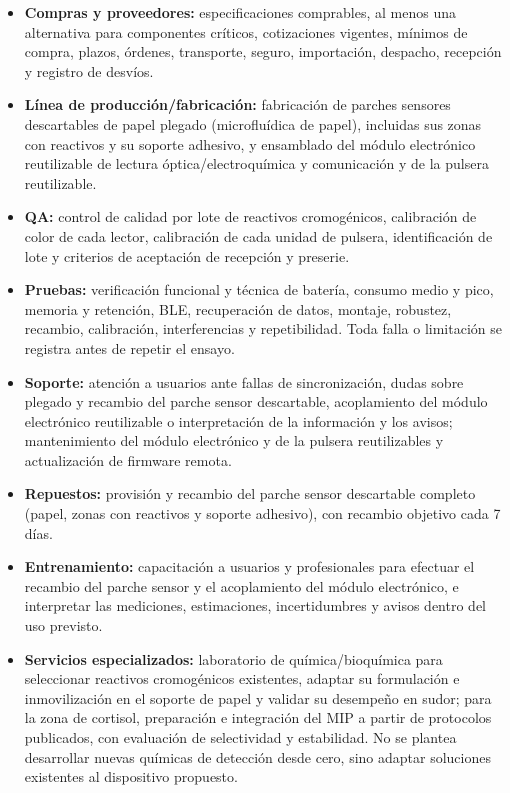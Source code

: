 \begin{itemize}
    \item \textbf{Compras y proveedores:} especificaciones comprables, al menos una alternativa para componentes críticos, cotizaciones vigentes, mínimos de compra, plazos, órdenes, transporte, seguro, importación, despacho, recepción y registro de desvíos.
    \item \textbf{Línea de producción/fabricación:} fabricación de parches sensores descartables de papel plegado (microfluídica de papel), incluidas sus zonas con reactivos y su soporte adhesivo, y ensamblado del módulo electrónico reutilizable de lectura óptica/electroquímica y comunicación y de la pulsera reutilizable.
    \item \textbf{QA:} control de calidad por lote de reactivos cromogénicos, calibración de color de cada lector, calibración de cada unidad de pulsera, identificación de lote y criterios de aceptación de recepción y preserie.
    \item \textbf{Pruebas:} verificación funcional y técnica de batería, consumo medio y pico, memoria y retención, BLE, recuperación de datos, montaje, robustez, recambio, calibración, interferencias y repetibilidad. Toda falla o limitación se registra antes de repetir el ensayo.
    \item \textbf{Soporte:} atención a usuarios ante fallas de sincronización, dudas sobre plegado y recambio del parche sensor descartable, acoplamiento del módulo electrónico reutilizable o interpretación de la información y los avisos; mantenimiento del módulo electrónico y de la pulsera reutilizables y actualización de firmware remota.
    \item \textbf{Repuestos:} provisión y recambio del parche sensor descartable completo (papel, zonas con reactivos y soporte adhesivo), con recambio objetivo cada 7 días.
    \item \textbf{Entrenamiento:} capacitación a usuarios y profesionales para efectuar el recambio del parche sensor y el acoplamiento del módulo electrónico, e interpretar las mediciones, estimaciones, incertidumbres y avisos dentro del uso previsto.
    \item \textbf{Servicios especializados:} laboratorio de química/bioquímica para seleccionar reactivos cromogénicos existentes, adaptar su formulación e inmovilización en el soporte de papel y validar su desempeño en sudor; para la zona de cortisol, preparación e integración del MIP a partir de protocolos publicados, con evaluación de selectividad y estabilidad. No se plantea desarrollar nuevas químicas de detección desde cero, sino adaptar soluciones existentes al dispositivo propuesto.
\end{itemize}

